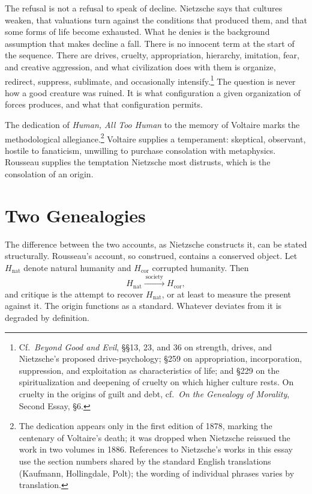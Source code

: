 \documentclass[11pt]{article}
\theoremstyle{definition}
\begin{document}
The refusal is not a refusal to speak of decline. Nietzsche says that cultures weaken, that valuations turn against the conditions that produced them, and that some forms of life become exhausted. What he denies is the background assumption that makes decline a fall. There is no innocent term at the start of the sequence. There are drives, cruelty, appropriation, hierarchy, imitation, fear, and creative aggression, and what civilization does with them is organize, redirect, suppress, sublimate, and occasionally intensify.\footnote{Cf.\ \emph{Beyond Good and Evil}, \S\S13, 23, and 36 on strength, drives, and Nietzsche's proposed drive-psychology; \S259 on appropriation, incorporation, suppression, and exploitation as characteristics of life; and \S229 on the spiritualization and deepening of cruelty on which higher culture rests. On cruelty in the origins of guilt and debt, cf.\ \emph{On the Genealogy of Morality}, Second Essay, \S6.} The question is never how a good creature was ruined. It is what configuration a given organization of forces produces, and what that configuration permits.

The dedication of \emph{Human, All Too Human} to the memory of Voltaire marks the methodological allegiance.\footnote{The dedication appears only in the first edition of 1878, marking the centenary of Voltaire's death; it was dropped when Nietzsche reissued the work in two volumes in 1886. References to Nietzsche's works in this essay use the section numbers shared by the standard English translations (Kaufmann, Hollingdale, Polt); the wording of individual phrases varies by translation.} Voltaire supplies a temperament: skeptical, observant, hostile to fanaticism, unwilling to purchase consolation with metaphysics. Rousseau supplies the temptation Nietzsche most distrusts, which is the consolation of an origin.

\section{Two Genealogies}

The difference between the two accounts, as Nietzsche constructs it, can be stated structurally. Rousseau's account, so construed, contains a conserved object. Let $H_{\mathrm{nat}}$ denote natural humanity and $H_{\mathrm{cor}}$ corrupted humanity. Then
\[
H_{\mathrm{nat}} \xrightarrow{\ \text{society}\ } H_{\mathrm{cor}},
\]
and critique is the attempt to recover $H_{\mathrm{nat}}$, or at least to measure the present against it. The origin functions as a standard. Whatever deviates from it is degraded by definition.
\end{document}
